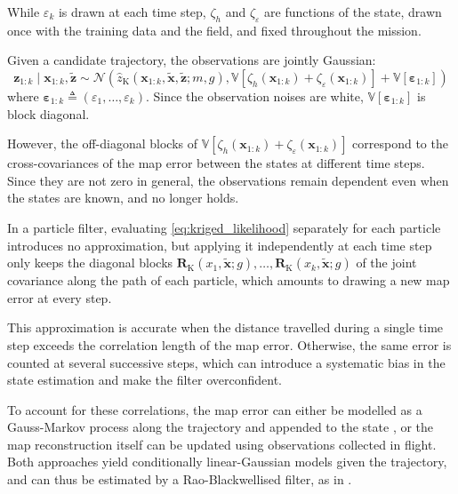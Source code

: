 While $\varepsilon_k$ is drawn at each time step, $\zeta_h$ and $\zeta_\varepsilon$ are functions of the state, drawn once with the training data and the field, and fixed throughout the mission.

Given a candidate trajectory, the observations are jointly Gaussian:
\begin{equation}
	\mathbf{z}_{1:k}\mid\mathbf{x}_{1:k},\tilde{\mathbf{z}}\sim\mathcal{N}\left(\hat{z}_{\mathrm{K}}(\mathbf{x}_{1:k},\tilde{\mathbf{x}},\tilde{\mathbf{z}};m,g),\mathbb{V}\left[\zeta_h(\mathbf{x}_{1:k})+\zeta_\varepsilon(\mathbf{x}_{1:k})\right]+\mathbb{V}\left[\boldsymbol{\varepsilon}_{1:k}\right]\right)
\end{equation}
where $\boldsymbol{\varepsilon}_{1:k}\triangleq(\varepsilon_1,\dots,\varepsilon_k)$. Since the observation noises are white, $\mathbb{V}\left[\boldsymbol{\varepsilon}_{1:k}\right]$ is block diagonal.

However, the off-diagonal blocks of $\mathbb{V}\left[\zeta_h(\mathbf{x}_{1:k})+\zeta_\varepsilon(\mathbf{x}_{1:k})\right]$ correspond to the cross-covariances of the map error between the states at different time steps. Since they are not zero in general, the observations remain dependent even when the states are known, and  no longer holds.

In a particle filter, evaluating \eqref{eq:kriged_likelihood} separately for each particle introduces no approximation, but applying it independently at each time step only keeps the diagonal blocks $\mathbf{R}_{\mathrm{K}}(x_1,\tilde{\mathbf{x}};g),\dots,\mathbf{R}_{\mathrm{K}}(x_k,\tilde{\mathbf{x}};g)$ of the joint covariance along the path of each particle, which amounts to drawing a new map error at every step.

This approximation is accurate when the distance travelled during a single time step exceeds the correlation length of the map error. Otherwise, the same error is counted at several successive steps, which can introduce a systematic bias in the state estimation and make the filter overconfident.

To account for these correlations, the map error can either be modelled as a Gauss-Markov process along the trajectory \cite{bib:correlated-map-error} and appended to the state \cite{bib:colored-noise}, or the map reconstruction itself can be updated using observations collected in flight. Both approaches yield conditionally linear-Gaussian models given the trajectory, and can thus be estimated by a Rao-Blackwellised filter, as in .

